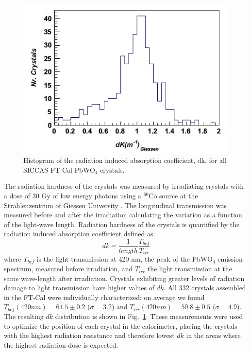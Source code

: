 \begin{figure}[th!]
\centering 
\includegraphics[width=0.85\columnwidth]{./fig/dk.jpeg} 
\caption{Histogram of the radiation induced absorption coefficient, dk, for all SICCAS FT-Cal
 PbWO$_4$ crystals.}
\label{fig:dk} 
\end{figure}
The radiation hardness of the crystals was measured  by irradiating crystals with a dose of 30 Gy of  low energy photons using a $^{60}$Co source at the Strahlenzentrum of Giessen University \cite{radhard}. The longitudinal transmission was measured before and after the irradiation calculating the variation as a function of the light-wave length. Radiation hardness of the crystals is quantified by the radiation induced absorption coefficient defined as:
\begin{equation}
dk = \frac{1}{length}\frac{T_{bef}}{T_{irr}}
\end{equation}
where $T_{bef}$ is the light transmission at 420 nm, the peak of the PbWO$_4$ emission spectrum, measured before irradiation, and $T_{irr}$ the light transmission at the same wave-length  after irradiation. 
Crystals exhibiting greater levels of radiation damage to light transmission have higher values of $dk$. 
All 332 crystals assembled in the FT-Cal were individually characterized: on average we found 
$T_{bef}(420 nm) = 61.5 \pm 0.2$ ($\sigma=3.2$) and 
$T_{irr}(420 nm) = 50.8 \pm 0.5$ ($\sigma=4.9$). 
The resulting $dk$ distribution is shown in Fig.~\ref{fig:dk}.
These measurements were used to optimize the position of each crystal in the calorimeter, placing the crystals with the highest radiation resistance and therefore lowest $dk$ in the areas where the highest radiation dose is expected.

